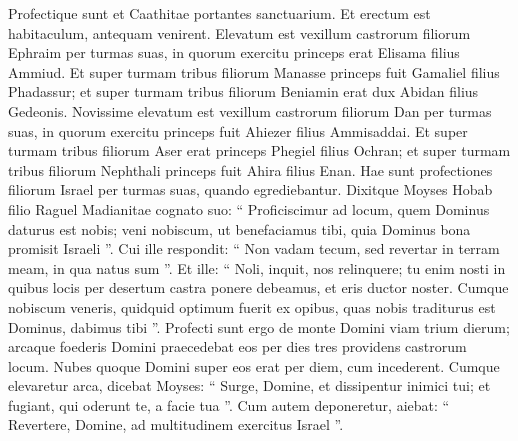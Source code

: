 \begin{biblechapter}
\begin{biblechapter}
\begin{biblechapter}
\begin{biblechapter}
\begin{biblechapter}
\begin{biblechapter}
\begin{biblechapter}
\begin{biblechapter}
\begin{biblechapter}
\begin{biblechapter}
 \verse Profectique sunt et Caathitae portantes sanctuarium. Et erectum est habitaculum, antequam venirent.
 \verse Elevatum est vexillum castrorum filiorum Ephraim per turmas suas, in quorum exercitu princeps erat Elisama filius Ammiud. 
\verse Et super turmam tribus filiorum Manasse princeps fuit Gamaliel filius Phadassur; 
\verse et super turmam tribus filiorum Beniamin erat dux Abidan filius Gedeonis.
 \verse Novissime elevatum est vexillum castrorum filiorum Dan per turmas suas, in quorum exercitu princeps fuit Ahiezer filius Ammisaddai. 
\verse Et super turmam tribus filiorum Aser erat princeps Phegiel filius Ochran; 
\verse et super turmam tribus filiorum Nephthali princeps fuit Ahira filius Enan.
 \verse Hae sunt profectiones filiorum Israel per turmas suas, quando egrediebantur.
 \verse Dixitque Moyses Hobab filio Raguel Madianitae cognato suo: “ Proficiscimur ad locum, quem Dominus daturus est nobis; veni nobiscum, ut benefaciamus tibi, quia Dominus bona promisit Israeli ”. 
\verse Cui ille respondit: “ Non vadam tecum, sed revertar in terram meam, in qua natus sum ”. 
\verse Et ille: “ Noli, inquit, nos relinquere; tu enim nosti in quibus locis per desertum castra ponere debeamus, et eris ductor noster. 
\verse Cumque nobiscum veneris, quidquid optimum fuerit ex opibus, quas nobis traditurus est Dominus, dabimus tibi ”.
 \verse Profecti sunt ergo de monte Domini viam trium dierum; arcaque foederis Domini praecedebat eos per dies tres providens castrorum locum. 
\verse Nubes quoque Domini super eos erat per diem, cum incederent. 
\verse Cumque elevaretur arca, dicebat Moyses: “ Surge, Domine, et dissipentur inimici tui; et fugiant, qui oderunt te, a facie tua ”. 
\verse Cum autem deponeretur, aiebat: “ Revertere, Domine, ad multitudinem exercitus Israel ”.
 

\end{biblechapter}
\end{biblechapter}
\end{biblechapter}
\end{biblechapter}
\end{biblechapter}
\end{biblechapter}
\end{biblechapter}
\end{biblechapter}
\end{biblechapter}
\end{biblechapter}
